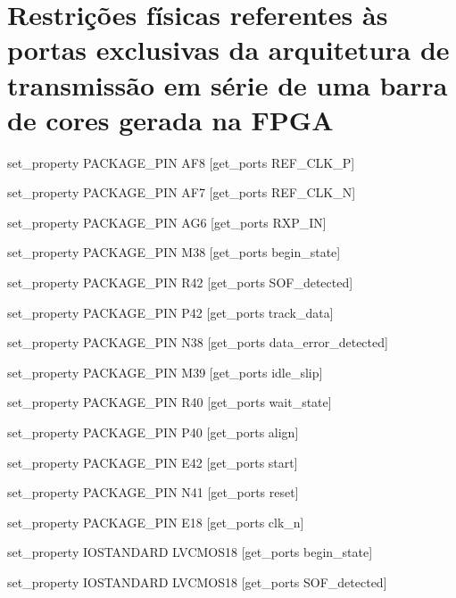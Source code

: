 %

\section{Restrições físicas referentes às portas exclusivas da arquitetura de transmissão em série de uma barra de cores gerada na FPGA} \label{ap:fisicas_planD}

set\_property PACKAGE\_PIN AF8 [get\_ports REF\_CLK\_P]

set\_property PACKAGE\_PIN AF7 [get\_ports REF\_CLK\_N]

set\_property PACKAGE\_PIN AG6 [get\_ports RXP\_IN]

set\_property PACKAGE\_PIN M38 [get\_ports begin\_state]

set\_property PACKAGE\_PIN R42 [get\_ports SOF\_detected]

set\_property PACKAGE\_PIN P42 [get\_ports track\_data]

set\_property PACKAGE\_PIN N38 [get\_ports data\_error\_detected]

set\_property PACKAGE\_PIN M39 [get\_ports idle\_slip]

set\_property PACKAGE\_PIN R40 [get\_ports wait\_state]

set\_property PACKAGE\_PIN P40 [get\_ports align]

set\_property PACKAGE\_PIN E42 [get\_ports start]

set\_property PACKAGE\_PIN N41 [get\_ports reset]

set\_property PACKAGE\_PIN E18 [get\_ports clk\_n]

set\_property IOSTANDARD LVCMOS18 [get\_ports begin\_state]

set\_property IOSTANDARD LVCMOS18 [get\_ports SOF\_detected]

